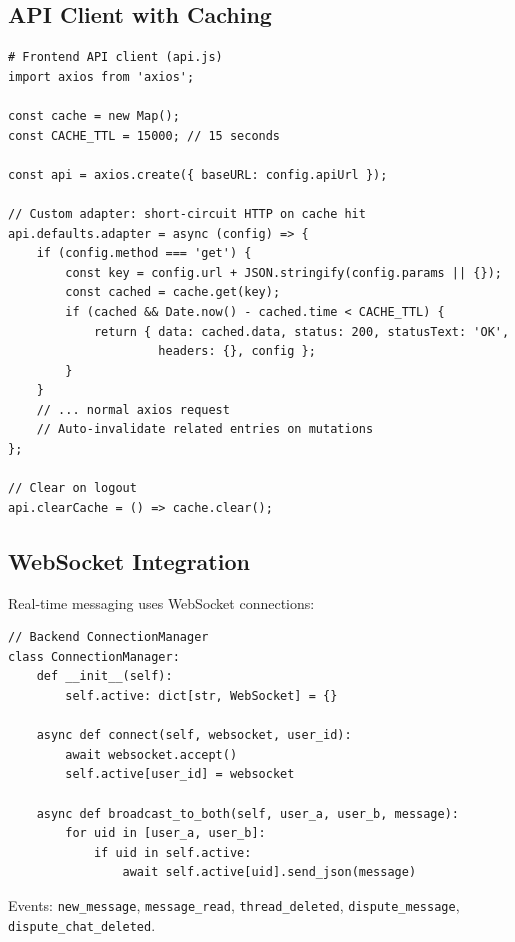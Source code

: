 \documentclass[12pt,a4paper]{article}
\begin{document}
\subsection{API Client with Caching}
\begin{lstlisting}[style=pythonstyle]
# Frontend API client (api.js)
import axios from 'axios';

const cache = new Map();
const CACHE_TTL = 15000; // 15 seconds

const api = axios.create({ baseURL: config.apiUrl });

// Custom adapter: short-circuit HTTP on cache hit
api.defaults.adapter = async (config) => {
    if (config.method === 'get') {
        const key = config.url + JSON.stringify(config.params || {});
        const cached = cache.get(key);
        if (cached && Date.now() - cached.time < CACHE_TTL) {
            return { data: cached.data, status: 200, statusText: 'OK',
                     headers: {}, config };
        }
    }
    // ... normal axios request
    // Auto-invalidate related entries on mutations
};

// Clear on logout
api.clearCache = () => cache.clear();
\end{lstlisting}

\subsection{WebSocket Integration}
Real-time messaging uses WebSocket connections:

\begin{lstlisting}[style=pythonstyle]
// Backend ConnectionManager
class ConnectionManager:
    def __init__(self):
        self.active: dict[str, WebSocket] = {}

    async def connect(self, websocket, user_id):
        await websocket.accept()
        self.active[user_id] = websocket

    async def broadcast_to_both(self, user_a, user_b, message):
        for uid in [user_a, user_b]:
            if uid in self.active:
                await self.active[uid].send_json(message)
\end{lstlisting}

Events: \texttt{new\_message}, \texttt{message\_read}, \texttt{thread\_deleted}, \texttt{dispute\_message}, \texttt{dispute\_chat\_deleted}.

\end{document}
